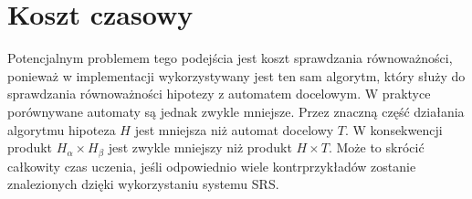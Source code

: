 \clearpage
\section{Koszt czasowy}

Potencjalnym problemem tego podejścia jest koszt sprawdzania równoważności, ponieważ w implementacji
wykorzystywany jest ten sam algorytm, który służy do sprawdzania równoważności hipotezy z automatem docelowym.
W praktyce porównywane automaty są jednak zwykle mniejsze. Przez znaczną część działania algorytmu hipoteza $H$
jest mniejsza niż automat docelowy $T$. W konsekwencji produkt $H_{\alpha} \times H_{\beta}$ jest zwykle mniejszy niż
produkt $H \times T$. Może to skrócić całkowity czas uczenia, jeśli odpowiednio wiele kontrprzykładów
zostanie znalezionych dzięki wykorzystaniu systemu SRS.